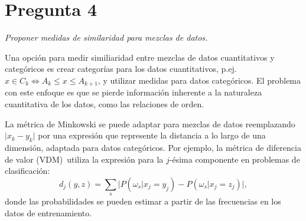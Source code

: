 \documentclass[spanish]{article}
\newcommand{\pregunta}{\textit}
\newcommand{\given}{\vert}
\newcommand{\abs}[1]{\lvert#1\rvert}
\begin{document}
\section*{Pregunta 4}
\pregunta{Proponer medidas de similaridad para mezclas de datos.}

Una opción para medir similiaridad entre mezclas de datos cuantitativos y categóricos es crear
categorías para los datos cuantitativos, p.ej. $x\in C_k\iff A_k\leq x\leq A_{k+1}$, y utilizar
medidas para datos categóricos.  El problema con este enfoque es que se pierde información
inherente a la naturaleza cuantitativa de los datos, como las relaciones de orden.

La métrica de Minkowski se puede adaptar para mezclas de datos reemplazando $\abs{x_k - y_k}$ por
una expresión que represente la distancia a lo largo de una dimensión, adaptada para datos
categóricos.  Por ejemplo, la métrica de diferencia de valor (VDM)~\footnotemark utiliza la
expresión para la $j$-ésima componente en problemas de clasificación:
\begin{equation}
    d_j(y, z) = \sum_{s}\bigl\lvert P(\omega_s\given x_j = y_j) -
                                    P(\omega_s\given x_j = z_j)\bigr\rvert,
\end{equation}
donde las probabilidades se pueden estimar a partir de las frecuencias en los datos de
entrenamiento.

\end{document}

